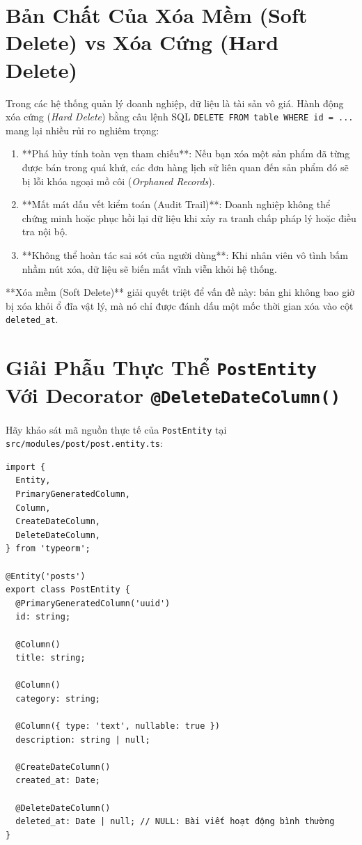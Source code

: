 \documentclass[12pt,a4paper,oneside]{book}
\begin{document}
\section{Bản Chất Của Xóa Mềm (Soft Delete) vs Xóa Cứng (Hard Delete)}
Trong các hệ thống quản lý doanh nghiệp, dữ liệu là tài sản vô giá. Hành động xóa cứng (\textit{Hard Delete}) bằng câu lệnh SQL \texttt{DELETE FROM table WHERE id = ...} mang lại nhiều rủi ro nghiêm trọng:
\begin{enumerate}
  \item **Phá hủy tính toàn vẹn tham chiếu**: Nếu bạn xóa một sản phẩm đã từng được bán trong quá khứ, các đơn hàng lịch sử liên quan đến sản phẩm đó sẽ bị lỗi khóa ngoại mồ côi (\textit{Orphaned Records}).
  \item **Mất mát dấu vết kiểm toán (Audit Trail)**: Doanh nghiệp không thể chứng minh hoặc phục hồi lại dữ liệu khi xảy ra tranh chấp pháp lý hoặc điều tra nội bộ.
  \item **Không thể hoàn tác sai sót của người dùng**: Khi nhân viên vô tình bấm nhầm nút xóa, dữ liệu sẽ biến mất vĩnh viễn khỏi hệ thống.
\end{enumerate}

**Xóa mềm (Soft Delete)** giải quyết triệt để vấn đề này: bản ghi không bao giờ bị xóa khỏi ổ đĩa vật lý, mà nó chỉ được đánh dấu một mốc thời gian xóa vào cột \texttt{deleted\_at}.

\section[Giải Phẫu Thực Thể PostEntity Với @DeleteDateColumn]{Giải Phẫu Thực Thể \texttt{PostEntity}\\ Với Decorator \texttt{@DeleteDateColumn()}}
Hãy khảo sát mã nguồn thực tế của \texttt{PostEntity} tại \texttt{src/modules/post/post.entity.ts}:

\begin{codebox}
\begin{Verbatim}[fontsize=\small]
import {
  Entity,
  PrimaryGeneratedColumn,
  Column,
  CreateDateColumn,
  DeleteDateColumn,
} from 'typeorm';

@Entity('posts')
export class PostEntity {
  @PrimaryGeneratedColumn('uuid')
  id: string;

  @Column()
  title: string;

  @Column()
  category: string;

  @Column({ type: 'text', nullable: true })
  description: string | null;

  @CreateDateColumn()
  created_at: Date;

  @DeleteDateColumn()
  deleted_at: Date | null; // NULL: Bài viết hoạt động bình thường
}
\end{Verbatim}
\end{codebox}
\end{document}
